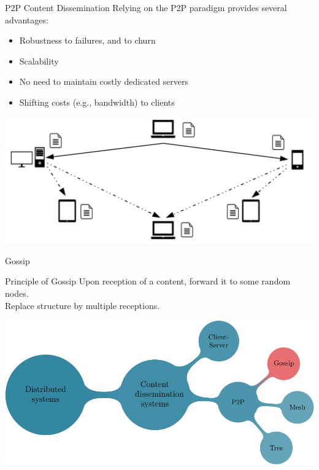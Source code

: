 \documentclass[10pt]{beamer}
\begin{document}
\begin{frame}{P2P Content Dissemination}{}
   \minipage[c][0.7\textheight][s]{\textwidth}
      Relying on the P2P paradigm provides several advantages:
      \begin{itemize}
         \item Robustness to failures, and to churn
         \item Scalability
         \item No need to maintain costly dedicated servers
         \item Shifting costs (e.g., bandwidth) to clients
      \end{itemize}
      \vfill
      \begin{center}
         \includegraphics[height=0.38\textheight]{fig/contentDisseminationP2P}
      \end{center}
   \endminipage
\end{frame}

\begin{frame}{Gossip}{}
   \minipage[c][0.7\textheight][s]{\textwidth}
      \begin{block}{Principle of Gossip}
         Upon reception of a content, forward it to some random nodes.\\
         Replace structure by multiple receptions.
      \end{block}
      \vfill
      \begin{center}
         \includegraphics[height=0.5\textheight]{fig/mindmap}
      \end{center}
   \endminipage  
\end{frame}
\end{document}
